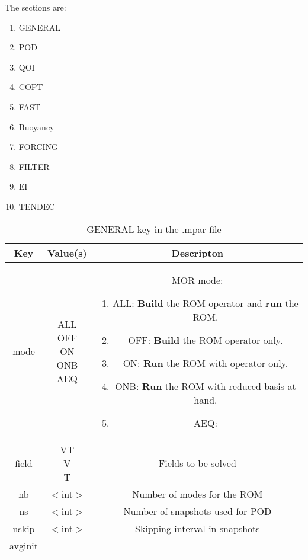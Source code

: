 The sections are: 
\begin{enumerate} \item GENERAL \item POD \item QOI \item
COPT \item FAST \item Buoyancy \item FORCING \item FILTER \item EI \item TENDEC
\end{enumerate}

\begin{table}[!h] \caption{GENERAL key in the .mpar file} \centering
   \begin{tabular}{|c|c|c|} \hline \multicolumn{1}{|c|}{Key} & Value(s) &
      Descripton \\ \hline mode                      &
      \makecell{ALL\\OFF\\ON\\ONB\\AEQ}      & \makecell[l]{MOR mode: \\
   \begin{minipage}{4in} \vskip 4pt \begin{enumerate} \item ALL: \textbf{Build}
         the ROM operator and \textbf{run} the ROM.  \item OFF: \textbf{Build}
            the ROM operator only.  \item ON: \textbf{Run} the ROM with
   operator only.  \item ONB: \textbf{Run} the ROM with reduced basis at hand.
   \item AEQ: \end{enumerate} \vskip 4pt \end{minipage}}  \\ \hline field
      & \makecell{VT\\V\\T}    &  Fields to be solved  \\ \hline nb
      &  $<$int$>$       & Number of modes for the ROM      \\ \hline ns
      &  $<$int$>$       & Number of snapshots used for POD \\ \hline nskip
      &  $<$int$>$       & Skipping interval in snapshots   \\ \hline avginit

\end{tabular}
\end{table}
